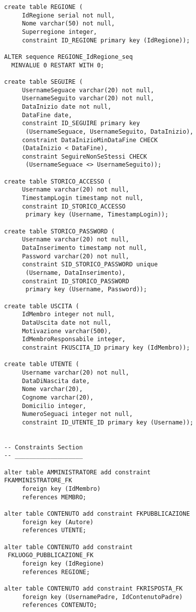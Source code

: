 \documentclass[a4paper,12pt]{report}
\begin{document}
\begin{lstlisting}
  create table REGIONE (
       IdRegione serial not null,
       Nome varchar(50) not null,
       Superregione integer,
       constraint ID_REGIONE primary key (IdRegione));
  
  ALTER sequence REGIONE_IdRegione_seq 
    MINVALUE 0 RESTART WITH 0;
  
  create table SEGUIRE (
       UsernameSeguace varchar(20) not null,
       UsernameSeguito varchar(20) not null,
       DataInizio date not null,
       DataFine date,
       constraint ID_SEGUIRE primary key 
        (UsernameSeguace, UsernameSeguito, DataInizio),
       constraint DataInizioMinDataFine CHECK 
       (DataInizio < DataFine),
       constraint SeguireNonSeStessi CHECK 
        (UsernameSeguace <> UsernameSeguito));
        
  create table STORICO_ACCESSO (
       Username varchar(20) not null,
       TimestampLogin timestamp not null,
       constraint ID_STORICO_ACCESSO 
        primary key (Username, TimestampLogin));
  
  create table STORICO_PASSWORD (
       Username varchar(20) not null,
       DataInserimento timestamp not null,
       Password varchar(20) not null,
       constraint SID_STORICO_PASSWORD unique 
        (Username, DataInserimento),
       constraint ID_STORICO_PASSWORD 
        primary key (Username, Password));
  
  create table USCITA (
       IdMembro integer not null,
       DataUscita date not null,
       Motivazione varchar(500),
       IdMembroResponsabile integer,
       constraint FKUSCITA_ID primary key (IdMembro));
  
  create table UTENTE (
       Username varchar(20) not null,
       DataDiNascita date,
       Nome varchar(20),
       Cognome varchar(20),
       Domicilio integer,
       NumeroSeguaci integer not null,
       constraint ID_UTENTE_ID primary key (Username));
  
  
  -- Constraints Section
  -- ___________________ 
  
  alter table AMMINISTRATORE add constraint 
  FKAMMINISTRATORE_FK
       foreign key (IdMembro)
       references MEMBRO;
  
  alter table CONTENUTO add constraint FKPUBBLICAZIONE
       foreign key (Autore)
       references UTENTE;
  
  alter table CONTENUTO add constraint
   FKLUOGO_PUBBLICAZIONE_FK
       foreign key (IdRegione)
       references REGIONE;
  
  alter table CONTENUTO add constraint FKRISPOSTA_FK
       foreign key (UsernamePadre, IdContenutoPadre)
       references CONTENUTO;
  

\end{lstlisting}
\end{document}
